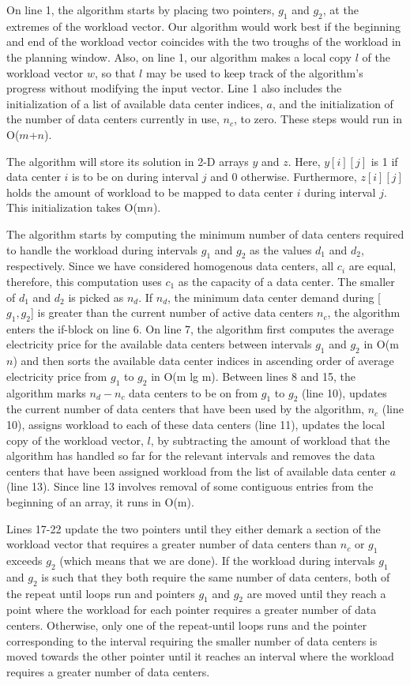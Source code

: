 On line 1, the algorithm starts by placing two pointers, $g_1$ and $g_2$, at the extremes of the workload vector. Our algorithm would work best if the beginning and end of the workload vector coincides with the two troughs of the workload in the planning window. Also, on line 1, our algorithm makes a local copy $l$ of the workload vector $w$, so that $l$ may be used to keep track of the algorithm's progress without modifying the input vector. Line 1 also includes the initialization of a list of available data center indices, $a$, and the initialization of the number of data centers currently in use, $n_c$, to zero. These steps would run in O($m$+$n$).

The algorithm will store its solution in 2-D arrays $y$ and $z$. Here, $y[i][j]$ is 1 if data center $i$ is to be on during interval $j$ and 0 otherwise. Furthermore, $z[i][j]$ holds the amount of workload to be mapped to data center $i$ during interval $j$. This initialization takes O(m$n$).

The algorithm starts by computing the minimum number of data centers required to handle the workload during intervals $g_1$ and $g_2$ as the values $d_1$ and $d_2$, respectively. Since we have considered homogenous data centers, all $c_i$ are equal, therefore, this computation uses $c_1$ as the capacity of a data center. The smaller of $d_1$ and $d_2$ is picked as $n_d$. If $n_d$, the minimum data center demand during [$g_1, g_2$] is greater than the current number of active data centers $n_c$, the algorithm enters the if-block on line 6. On line 7, the algorithm first computes the average electricity price for the available data centers between intervals $g_1$ and $g_2$ in O(m$n$) and then sorts the available data center indices in ascending order of average electricity price from $g_1$ to $g_2$ in O(m lg m). Between lines 8 and 15, the algorithm marks $n_d - n_c$ data centers to be on from $g_1$ to $g_2$ (line 10), updates the current number of data centers that have been used by the algorithm, $n_c$ (line 10), assigns workload to each of these data centers (line 11), updates the local copy of the workload vector, $l$, by subtracting the amount of workload  that the algorithm has handled so far for the relevant intervals and removes the data centers that have been assigned workload from the list of available data center $a$ (line 13). Since line 13 involves removal of some contiguous entries from the beginning of an array, it runs in O(m).

Lines 17-22 update the two pointers until they either demark a section of the workload vector that requires a greater number of data centers than $n_c$ or $g_1$ exceeds $g_2$ (which means that we are done). If the workload during intervals $g_1$ and $g_2$ is such that they both require the same number of data centers, both of the repeat until loops run and pointers $g_1$ and $g_2$ are moved until they reach a point where the workload for each pointer requires a greater number of data centers. Otherwise, only one of the repeat-until loops runs and the pointer corresponding to the interval requiring the smaller number of data centers is moved towards the other pointer until it reaches an interval where the workload requires a greater number of data centers.

